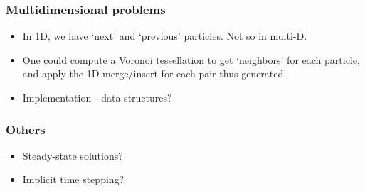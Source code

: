 \documentclass{article}
\begin{document}
\subsubsection{Multidimensional problems}
\begin{itemize}
	\item In 1D, we have `next' and `previous' particles. Not so in multi-D.
	\item One could compute a Voronoi tessellation to get `neighbors' for each particle, and apply the 1D merge/insert for each pair thus generated.
	\item Implementation - data structures?
\end{itemize}
 

\subsubsection{Others}
\begin{itemize}
	\item Steady-state solutions?
	\item Implicit time stepping?
\end{itemize}
 

\printbibliography
\end{document}
